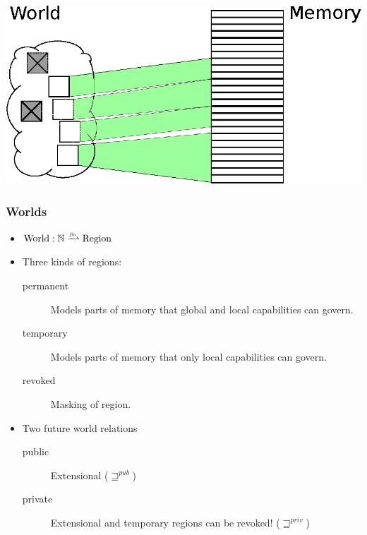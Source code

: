 \documentclass{beamer}
\newcommand{\finparfun}{\xrightharpoonup{\textit{\tiny{fin}}}}
\newcommand{\var}[1]{\mathit{#1}}
\newcommand{\futurewk}{\mathbin{\sqsupseteq}^{\var{pub}}}
\newcommand{\futurestr}{\mathbin{\sqsupseteq}^{\var{priv}}}
\newcommand{\plaindom}[1]{\mathrm{#1}}
\newcommand{\nats}{\mathbb{N}}
\newcommand{\Regions}{\plaindom{Region}}
\newcommand{\Worlds}{\plaindom{World}}
\begin{document}
\begin{frame}
\begin{overprint}
    \includegraphics{World8.eps}
  \end{overprint}
\end{frame}
\begin{frame}
  \frametitle{Worlds}
  \begin{itemize}[<+->]
  \item $\Worlds : \nats \finparfun \Regions$
  \item Three kinds of regions:
    \begin{description}
    \item[permanent] Models parts of memory that global and local capabilities can govern.
    \item[temporary] Models parts of memory that only local capabilities can govern.
    \item[revoked] Masking of region.
    \end{description}

  \item Two future world relations
    \begin{description}
    \item[public]  Extensional  ($\futurewk$)
    \item[private] Extensional and temporary regions can be revoked! ($\futurestr$)
    \end{description}
  \end{itemize}
\end{frame}
\end{document}

